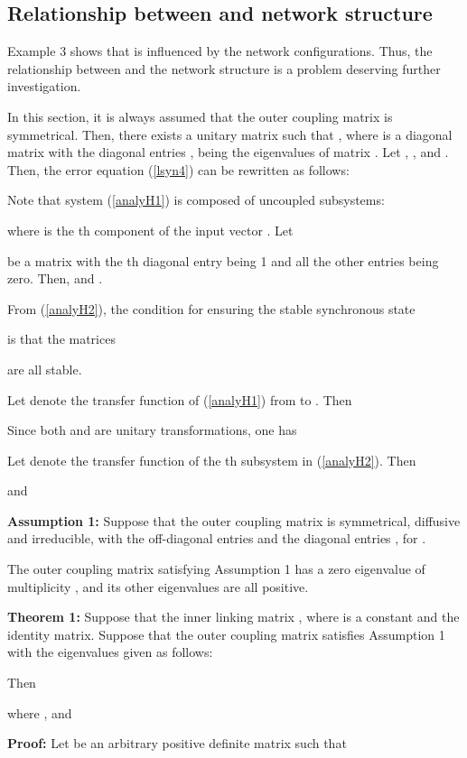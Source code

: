 \documentclass[11pt]{article}
\def\dref#1{(\ref{#1})}
\begin{document}
\subsection{Relationship between  and network structure}

\quad Example 3 shows that  is influenced by the network
configurations. Thus, the relationship between  and the
network structure is a problem deserving further investigation.

In this section, it is always assumed that the outer coupling matrix
 is symmetrical. Then, there exists a unitary matrix  such that , where
 is a
diagonal matrix with the diagonal entries
, being the eigenvalues of matrix .
Let , ,
 and .
Then, the error equation \dref{lsyn4} can be rewritten as follows:

Note that system \dref{analyH1} is composed of  uncoupled
subsystems:

where  is the th component of the input vector
.
Let

be a matrix with the th diagonal entry being 1 and all the other
entries being zero. Then,  and
.

From \dref{analyH2}, the condition for ensuring the stable
synchronous state

is that the  matrices

are all stable.

Let  denote the transfer function of \dref{analyH1} from
 to . Then

Since both  and  are
unitary transformations, one has

Let  denote
the transfer function of the th subsystem in \dref{analyH2}. Then

and


\textbf{Assumption 1:} Suppose that the outer coupling matrix  is
symmetrical, diffusive and irreducible, with the off-diagonal
entries  and the diagonal entries
, for .

The outer coupling matrix  satisfying Assumption 1 has a zero
eigenvalue of multiplicity , and its other eigenvalues are all
positive.

\textbf{Theorem 1:} Suppose that the inner linking matrix
, where  is a constant and  the identity matrix.
Suppose that the outer coupling matrix  satisfies Assumption 1
with the eigenvalues given as follows:

Then

where , and


{\bf Proof:} Let  be an arbitrary positive definite matrix such
that
\end{document}

